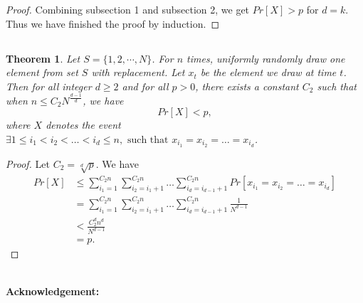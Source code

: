 \documentclass{article}
\newcommand{\Acknowledgement}[1]{\ \\{\bf Acknowledgement:} #1}
\newtheorem{theorem}{Theorem}
\begin{document}
\begin{spacing}{1.1}
\begin{proof}
    Combining subsection 1 and subsection 2, we get $Pr[X] > p$ for $d = k$. Thus we have finished the proof by induction.
    \end{proof}


    \subsection{}

    \begin{theorem}

    Let $S = \{1, 2, \cdots, N\}$. For $n$ times, uniformly randomly draw one element from set $S$ with replacement. Let $x_t$ be the element we draw at time $t$. Then for all integer $d\geq 2$ and for all $p > 0$, there exists a constant $C_2$ such that when $n \leq C_2 {N}^{\frac{d-1}{d}}$, we have
    $$Pr[X] < p,$$
    where $X$ denotes the event $\exists 1\leq i_1< i_2<\dots<i_d \leq n, \text{ such that } x_{i_1} = x_{i_2}=\dots=x_{i_d}$.

    \end{theorem}
    
    \begin{proof}
    
    Let $C_2=\sqrt[d]{p}$. We have
    \begin{align*}
    Pr[X]
    &\leq \sum_{i_1=1}^{C_2n}\sum_{i_2=i_1+1}^{C_2n}\dots\sum_{i_d=i_{d-1}+1}^{C_2n}Pr[x_{i_1} = x_{i_2}=\dots=x_{i_d}]  \\
    &=\sum_{i_1=1}^{C_2n}\sum_{i_2=i_1+1}^{C_2n}\dots\sum_{i_d=i_{d-1}+1}^{C_2n}\frac{1}{N^{d-1}}  \\
    &<\frac{C_2^dn^d}{N^{d-1}}  \\
    &=p.
    \end{align*}
    
    \end{proof}
    
    
    \Acknowledgement{}


    \end{spacing}
    
\end{document}
